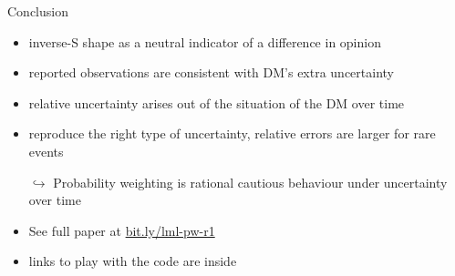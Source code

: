 \begin{frame}{Conclusion}
\begin{itemize}
  \item inverse-S shape as a neutral indicator of a difference in opinion
	\item reported observations are consistent with DM's extra uncertainty
	\item relative uncertainty arises out of the situation of the DM over time
	\item reproduce the right type of uncertainty, \ie relative errors are larger for rare events
  \item[$\hookrightarrow$] Probability weighting is rational cautious behaviour under uncertainty over time
  \item[]
  \item See full paper at \url{bit.ly/lml-pw-r1}
  \item links to play with the code are inside
\end{itemize}

\end{frame}
